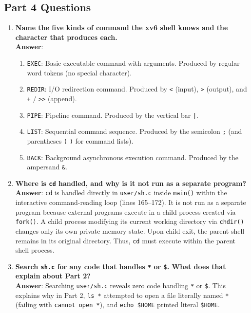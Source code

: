 \documentclass[12pt,a4paper]{article}
\begin{document}
\subsection{Part 4 Questions}
\begin{enumerate}
    \item \textbf{Name the five kinds of command the xv6 shell knows and the character that produces each.} \\
    \textbf{Answer}:
    \begin{enumerate}
        \item \texttt{EXEC}: Basic executable command with arguments. Produced by regular word tokens (no special character).
        \item \texttt{REDIR}: I/O redirection command. Produced by \texttt{<} (input), \texttt{>} (output), and \texttt{+} / \texttt{>>} (append).
        \item \texttt{PIPE}: Pipeline command. Produced by the vertical bar \texttt{|}.
        \item \texttt{LIST}: Sequential command sequence. Produced by the semicolon \texttt{;} (and parentheses \texttt{(} \texttt{)} for command lists).
        \item \texttt{BACK}: Background asynchronous execution command. Produced by the ampersand \texttt{\&}.
    \end{enumerate}

    \item \textbf{Where is \texttt{cd} handled, and why is it not run as a separate program?} \\
    \textbf{Answer}: \texttt{cd} is handled directly in \texttt{user/sh.c} inside \texttt{main()} within the interactive command-reading loop (lines 165--172). It is not run as a separate program because external programs execute in a child process created via \texttt{fork()}. A child process modifying its current working directory via \texttt{chdir()} changes only its own private memory state. Upon child exit, the parent shell remains in its original directory. Thus, \texttt{cd} must execute within the parent shell process.

    \item \textbf{Search \texttt{sh.c} for any code that handles \texttt{*} or \texttt{\$}. What does that explain about Part 2?} \\
    \textbf{Answer}: Searching \texttt{user/sh.c} reveals zero code handling \texttt{*} or \texttt{\$}. This explains why in Part 2, \texttt{ls *} attempted to open a file literally named \texttt{*} (failing with \texttt{cannot open *}), and \texttt{echo \$HOME} printed literal \texttt{\$HOME}.
\end{enumerate}
\end{document}
